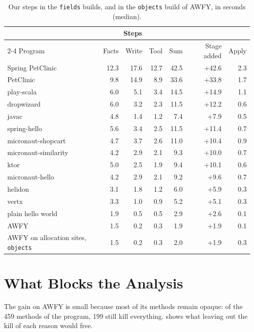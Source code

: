 \begin{table}[t]
    \centering
    \caption{Our steps in the \texttt{fields} builds, and in the \texttt{objects} build of AWFY, in seconds (median).}
    \label{tab:eval-steps}
    \footnotesize
    \setlength{\tabcolsep}{4pt}
    \begin{tabular}{lrrrrrr}
        \toprule
        & \multicolumn{3}{c}{Steps} & & & \\
        \cmidrule(lr){2-4}
        Program & Facts & Write & Tool & Sum & Stage added & Apply \\
        \midrule
        Spring PetClinic & 12.3 & 17.6 & 12.7 & 42.5 & +42.6 & 2.3 \\
        PetClinic & 9.8 & 14.9 & 8.9 & 33.6 & +33.8 & 1.7 \\
        play-scala & 6.0 & 5.1 & 3.4 & 14.5 & +14.9 & 1.1 \\
        dropwizard & 6.0 & 3.2 & 2.3 & 11.5 & +12.2 & 0.6 \\
        javac & 4.8 & 1.4 & 1.2 & 7.4 & +7.9 & 0.5 \\
        spring-hello & 5.6 & 3.4 & 2.5 & 11.5 & +11.4 & 0.7 \\
        micronaut-shopcart & 4.7 & 3.7 & 2.6 & 11.0 & +10.4 & 0.9 \\
        micronaut-similarity & 4.2 & 2.9 & 2.1 & 9.3 & +10.0 & 0.7 \\
        ktor & 5.0 & 2.5 & 1.9 & 9.4 & +10.1 & 0.6 \\
        micronaut-hello & 4.2 & 2.9 & 2.1 & 9.2 & +9.6 & 0.7 \\
        helidon & 3.1 & 1.8 & 1.2 & 6.0 & +5.9 & 0.3 \\
        vertx & 3.3 & 1.0 & 0.9 & 5.2 & +5.1 & 0.3 \\
        plain hello world & 1.9 & 0.5 & 0.5 & 2.9 & +2.6 & 0.1 \\
        \midrule
        AWFY & 1.5 & 0.2 & 0.3 & 1.9 & +1.9 & 0.1 \\
        AWFY on allocation sites, \texttt{objects} & 1.5 & 0.2 & 0.3 & 2.0 & +1.9 & 0.3 \\
        \bottomrule
    \end{tabular}
\end{table}

\section{What Blocks the Analysis}\label{sec:eval-blockers}

The gain on AWFY is small because most of its methods remain opaque: of the 459 methods of the program, 199 still kill
everything.  shows what leaving out the kill of each reason would free.

